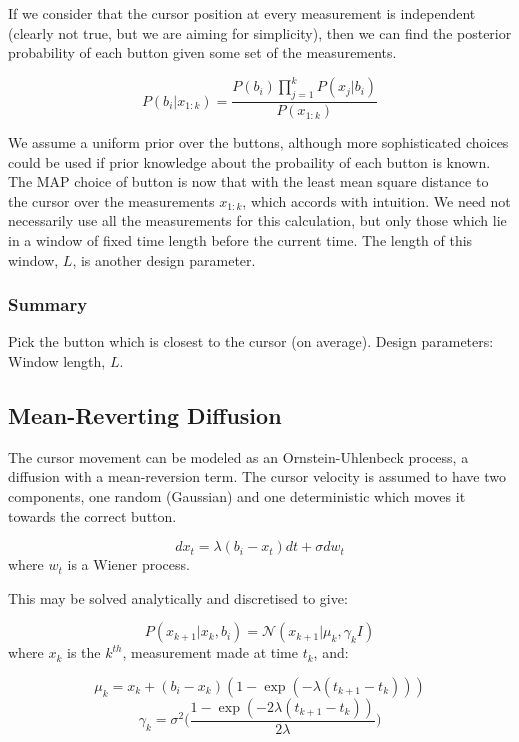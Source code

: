 If we consider that the cursor position at every measurement is independent (clearly not true, but we are aiming for simplicity), then we can find the posterior probability of each button given some set of the measurements.

\begin{equation}
P(b_i|x_{1:k}) = \frac{P(b_i)\prod_{j=1}^{k}{P(x_j| b_i)}}{P(x_{1:k})}
\end{equation}

We assume a uniform prior over the buttons, although more sophisticated choices could be used if prior knowledge about the probaility of each button is known. The MAP choice of button is now that with the least mean square distance to the cursor over the measurements $x_{1:k}$, which accords with intuition. We need not necessarily use all the measurements for this calculation, but only those which lie in a window of fixed time length before the current time. The length of this window, $L$, is another design parameter.

\subsubsection*{Summary}
Pick the button which is closest to the cursor (on average).
Design parameters: Window length, $L$.



\subsection{Mean-Reverting Diffusion}
The cursor movement can be modeled as an Ornstein-Uhlenbeck process, a diffusion with a mean-reversion term. The cursor velocity is assumed to have two components, one random (Gaussian) and one deterministic which moves it towards the correct button.

\begin{equation}dx_t = \lambda (b_i - x_t)dt + \sigma dw_t\end{equation}
where $w_t$ is a Wiener process.

This may be solved analytically and discretised to give:

\begin{equation}P(x_{k+1}|x_{k}, b_i) = \mathcal{N} ( x_{k+1} | \mu_k, \gamma_k I)\end{equation}
where $x_k$ is the $k^{th}$, measurement made at time $t_k$, and:

\begin{equation}\mu_k = x_{k} + (b_i - x_k) (1-\exp(-\lambda (t_{k+1} - t_k)))\end{equation}
\begin{equation}\gamma_k = \sigma^2 \bigg (\frac{1-\exp(-2 \lambda (t_{k+1} - t_k))}{2 \lambda} \bigg )\end{equation}

